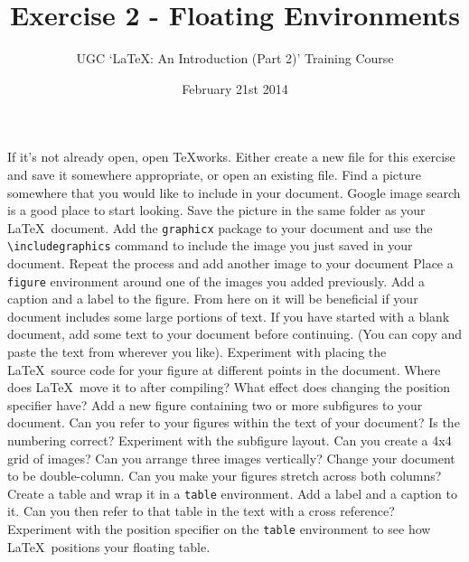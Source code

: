 \documentclass[11pt]{exam}
\title{Exercise 2 - Floating Environments}
\author{UGC `\LaTeX: An Introduction (Part 2)' Training Course}
\date{February 21st 2014}
\begin{document}
\maketitle


\vspace{0.2in}

\begin{questions}
\question
If it's not already open, open TeXworks. Either create a new file for this exercise and save it somewhere appropriate, or open an existing file.
\question
Find a picture somewhere that you would like to include in your document. Google image search is a good place to start looking.
\question
Save the picture in the same folder as your \LaTeX\ document.
\question
Add the \texttt{graphicx} package to your document and use the \texttt{{\textbackslash}includegraphics} command to include the image you just saved in your document.
\question
Repeat the process and add another image to your document
\question
Place a \texttt{figure} environment around one of the images you added previously.
\question
Add a caption and a label to the figure.
\uplevel
{From here on it will be beneficial if your document includes some large portions of text. If you have started with a blank document, add some text to your document before continuing. (You can copy and paste the text from wherever you like).}
\question
Experiment with placing the \LaTeX\ source code for your figure at different points in the document. Where does \LaTeX\ move it to after compiling? 
\question
What effect does changing the position specifier have?
\question
Add a new figure containing two or more subfigures to your document. 
\question
Can you refer to your figures within the text of your document? Is the numbering correct?
\question
Experiment with the subfigure layout. Can you create a 4x4 grid of images? Can you arrange three images vertically?
\question
Change your document to be double-column. Can you make your figures stretch across both columns?
\question 
Create a table and wrap it in a \texttt{table} environment. Add a label and a caption to it. Can you then refer to that table in the text with a cross reference?
\question
Experiment with the position specifier on the \texttt{table} environment to see how \LaTeX\ positions your floating table.
\end{questions}
\end{document}
